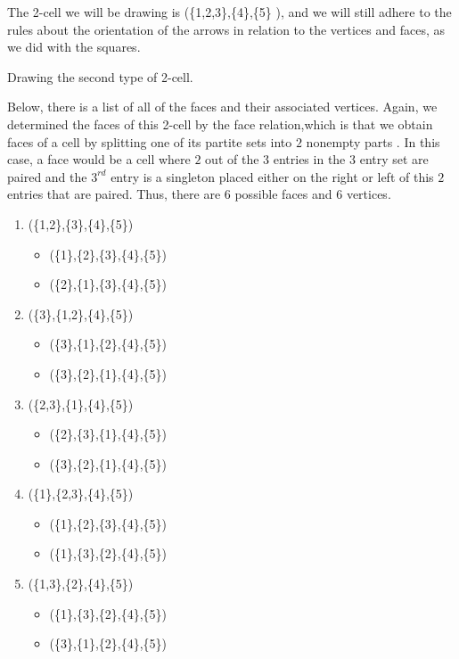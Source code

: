 \documentclass{amsart}
\begin{document}
The 2-cell we will be drawing is (\{1,2,3\},\{4\},\{5\} ), and we will still adhere to the rules about the orientation of the arrows in relation to the vertices and faces, as we did with the squares.
\begin{exmp} Drawing the second type of 2-cell.

Below, there is a list of all of the faces and their associated vertices. Again, we determined the faces of this 2-cell by the face relation,which is that we obtain faces of a cell by splitting one of its partite sets into $2$ nonempty parts \cite{}. In this case, a face would be a cell where $2$ out of the $3$ entries in the $3$ entry set are paired and the $3^{rd}$ entry is a singleton placed either on the right or left of this $2$ entries that are paired. Thus, there are $6$ possible faces and $6$ vertices.
\begin{enumerate}
\item
(\{1,2\},\{3\},\{4\},\{5\})
\begin{itemize}
\item 
(\{1\},\{2\},\{3\},\{4\},\{5\})
\item
(\{2\},\{1\},\{3\},\{4\},\{5\})
\end{itemize}
\item
(\{3\},\{1,2\},\{4\},\{5\})
\begin{itemize}
\item
(\{3\},\{1\},\{2\},\{4\},\{5\})
\item
(\{3\},\{2\},\{1\},\{4\},\{5\})
\end{itemize}
\item
(\{2,3\},\{1\},\{4\},\{5\})
\begin{itemize}
\item 
(\{2\},\{3\},\{1\},\{4\},\{5\})
\item
(\{3\},\{2\},\{1\},\{4\},\{5\})
\end{itemize}
\item
(\{1\},\{2,3\},\{4\},\{5\})
\begin{itemize}
\item 
(\{1\},\{2\},\{3\},\{4\},\{5\})
\item
(\{1\},\{3\},\{2\},\{4\},\{5\})
\end{itemize}
\item
(\{1,3\},\{2\},\{4\},\{5\})
\begin{itemize}
\item 
(\{1\},\{3\},\{2\},\{4\},\{5\})
\item
(\{3\},\{1\},\{2\},\{4\},\{5\})
\end{itemize}

\end{enumerate}
\end{exmp}
\end{document}
